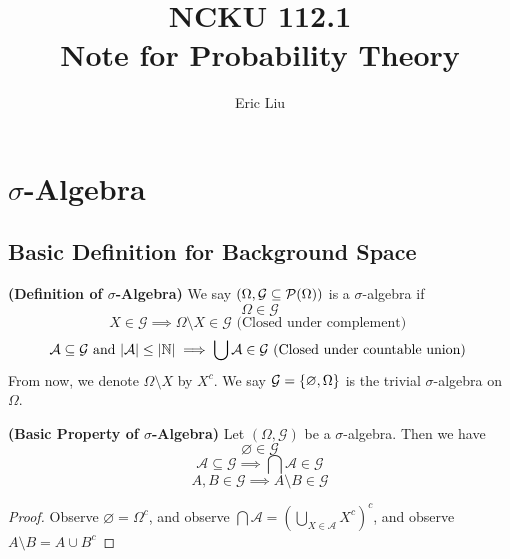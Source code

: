 \documentclass{report}
\title{\Huge{NCKU 112.1}\\Note for Probability Theory}
\author{\huge{Eric Liu}}
\date{}
\begin{document}
\maketitle
\newpage%
\tableofcontents
\pagebreak
\chapter{$\sigma$-Algebra}
\section{Basic Definition for Background Space}
\begin{definition}
\label{1.1.1}
\textbf{(Definition of $\sigma$-Algebra)} We say  $(\Omega,\mathcal{G}\subseteq\mathcal{P}(\Omega))$ is a $\sigma$-algebra if 
\begin{equation}
\Omega \in\mathcal{G}
\end{equation}
\begin{equation}
X \in \mathcal{G}\implies \Omega \setminus X\in \mathcal{G} \text{ (Closed under complement) }
\end{equation}
\begin{equation}
\mathcal{A} \subseteq  \mathcal{G}\text{ and }|\mathcal{A}|\leq |\mathbb{N}|\implies \bigcup \mathcal{A}\in \mathcal{G}\text{ (Closed under countable union) }
\end{equation}
From now, we denote $\Omega\setminus X$ by $X^c$. We say $\mathcal{G}=\{ \varnothing,\Omega \}$ is the trivial $\sigma$-algebra on $\Omega$. 
\end{definition}
\begin{theorem}
\label{1.1.2}
\textbf{(Basic Property of $\sigma$-Algebra)} Let $(\Omega,\mathcal{G})$ be a $\sigma$-algebra. Then we have
\begin{equation}
\varnothing \in \mathcal{G}
\end{equation}
\begin{equation}
\mathcal{A}\subseteq \mathcal{G}\implies \bigcap \mathcal{A} \in \mathcal{G}
\end{equation}
\begin{equation}
A,B\in \mathcal{G}\implies A\setminus B \in \mathcal{G}
\end{equation}
\end{theorem}
\begin{proof}
Observe $\varnothing=\Omega^c$, and observe $\bigcap \mathcal{A}=(\bigcup_{X \in \mathcal{A}}X^c)^c$, and observe $A\setminus B=A\cup B^c$
\end{proof}
\end{document}
